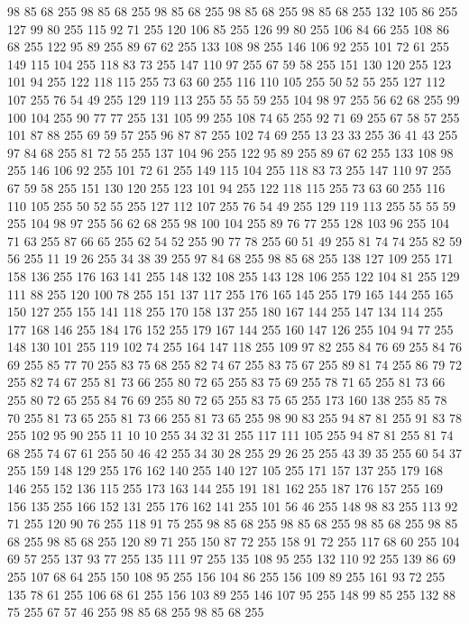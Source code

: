 98 85 68 255 98 85 68 255 98 85 68 255 98 85 68 255 98 85 68 255 132 105 86 255 127 99 80 255 115 92 71 255 120 106 85 255 126 99 80 255 106 84 66 255 108 86 68 255 122 95 89 255 89 67 62 255 133 108 98 255 146 106 92 255 101 72 61 255 149 115 104 255 118 83 73 255 147 110 97 255 67 59 58 255 151 130 120 255 123 101 94 255 122 118 115 255 73 63 60 255 116 110 105 255 50 52 55 255 127 112 107 255 76 54 49 255 129 119 113 255 55 55 59 255 104 98 97 255 56 62 68 255 99 100 104 255 90 77 77 255 131 105 99 255 108 74 65 255 92 71 69 255 67 58 57 255 101 87 88 255 69 59 57 255 96 87 87 255 102 74 69 255 13 23 33 255 36 41 43 255 97 84 68 255 81 72 55 255 137 104 96 255 122 95 89 255 89 67 62 255 133 108 98 255 146 106 92 255 101 72 61 255 149 115 104 255 118 83 73 255 147 110 97 255 67 59 58 255 151 130 120 255 123 101 94 255 122 118 115 255 73 63 60 255 116 110 105 255 50 52 55 255 127 112 107 255
76 54 49 255 129 119 113 255 55 55 59 255 104 98 97 255 56 62 68 255 98 100 104 255 89 76 77 255 128 103 96 255 104 71 63 255 87 66 65 255 62 54 52 255 90 77 78 255 60 51 49 255 81 74 74 255 82 59 56 255 11 19 26 255 34 38 39 255 97 84 68 255 98 85 68 255 138 127 109 255 171 158 136 255 176 163 141 255 148 132 108 255 143 128 106 255 122 104 81 255 129 111 88 255 120 100 78 255 151 137 117 255 176 165 145 255 179 165 144 255 165 150 127 255 155 141 118 255 170 158 137 255 180 167 144 255 147 134 114 255 177 168 146 255 184 176 152 255 179 167 144 255 160 147 126 255 104 94 77 255 148 130 101 255 119 102 74 255 164 147 118 255 109 97 82 255 84 76 69 255 84 76 69 255 85 77 70 255 83 75 68 255 82 74 67 255 83 75 67 255 89 81 74 255 86 79 72 255 82 74 67 255 81 73 66 255 80 72 65 255 83 75 69 255 78 71 65 255 81 73 66 255 80 72 65 255 84 76 69 255 80 72 65 255 83 75 65 255 173 160 138 255 85 78 70 255
81 73 65 255 81 73 66 255 81 73 65 255 98 90 83 255 94 87 81 255 91 83 78 255 102 95 90 255 11 10 10 255 34 32 31 255 117 111 105 255 94 87 81 255 81 74 68 255 74 67 61 255 50 46 42 255 34 30 28 255 29 26 25 255 43 39 35 255 60 54 37 255 159 148 129 255 176 162 140 255 140 127 105 255 171 157 137 255 179 168 146 255 152 136 115 255 173 163 144 255 191 181 162 255 187 176 157 255 169 156 135 255 166 152 131 255 176 162 141 255 101 56 46 255 148 98 83 255 113 92 71 255 120 90 76 255 118 91 75 255 98 85 68 255 98 85 68 255 98 85 68 255 98 85 68 255 98 85 68 255 120 89 71 255 150 87 72 255 158 91 72 255 117 68 60 255 104 69 57 255 137 93 77 255 135 111 97 255 135 108 95 255 132 110 92 255 139 86 69 255 107 68 64 255 150 108 95 255 156 104 86 255 156 109 89 255 161 93 72 255 135 78 61 255 106 68 61 255 156 103 89 255 146 107 95 255 148 99 85 255 132 88 75 255 67 57 46 255 98 85 68 255 98 85 68 255
